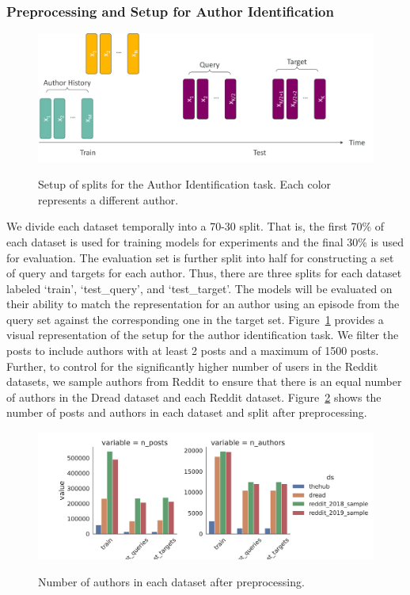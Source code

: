 \subsubsection{Preprocessing and Setup for Author Identification}
\begin{figure}
    \centering
    \includegraphics[width=0.9\linewidth,alt={Diagram showing how data is split for author identificaiton.}]{stylometryExtensions/figures/train_query_target_split}
    \caption{Setup of splits for the Author Identification task. Each color represents a different author.}
    \label{fig:stylometry_extensions:followingTrail:datasets:splits}
\end{figure}
We divide each dataset temporally into a 70-30 split.
That is, the first 70\% of each dataset is used for training models for experiments and the final 30\% is used for evaluation.
The evaluation set is further split into half for constructing a set of query and targets for each author.
Thus, there are three splits for each dataset labeled `train', `test\_query', and `test\_target'.
The models will be evaluated on their ability to match the representation for an author using an episode from the query set against the corresponding one in the target set.
Figure~\ref{fig:stylometry_extensions:followingTrail:datasets:splits} provides a visual representation of the setup for the author identification task. 
We filter the posts to include authors with at least 2 posts and a maximum of 1500 posts.
Further, to control for the significantly higher number of users in the Reddit datasets, we sample authors from Reddit to ensure that there is an equal number of authors in the Dread dataset and each Reddit dataset.
Figure~\ref{fig:stylometry_extensions:followingTrail:datasets:final_splits} shows the number of posts and authors in each dataset and split after preprocessing.


\begin{figure}
    \centering
    \includegraphics[width=0.9\linewidth,alt={Bar chart showing final statistics for each split.}]{stylometryExtensions/figures/FinalSplits.png}
    \caption{Number of authors in each dataset after preprocessing.}
    \label{fig:stylometry_extensions:followingTrail:datasets:final_splits}
\end{figure}

